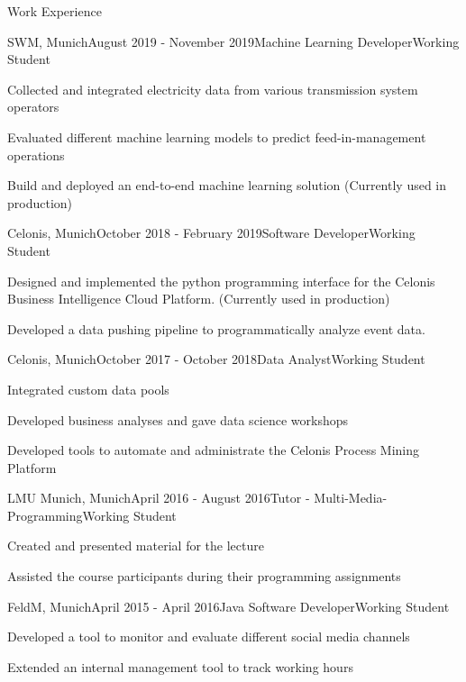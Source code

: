 \documentclass{resume} %
\begin{document}
\begin{rSection}{Work Experience}

\begin{rSubsection}{SWM, Munich}{August 2019 - November 2019}{Machine Learning Developer}{Working Student}
\item Collected and integrated electricity data from various 
transmission system operators
\item Evaluated different machine learning models to predict feed-in-management operations
\item Build and deployed an end-to-end machine learning solution (Currently used in production)
\end{rSubsection}

\begin{rSubsection}{Celonis, Munich}{October 2018 - February 2019}{Software Developer}{Working Student}
\item Designed and implemented the python programming interface for the Celonis Business Intelligence Cloud Platform. (Currently used in production)
\item Developed a data pushing pipeline to programmatically analyze event data.
\end{rSubsection}

\begin{rSubsection}{Celonis, Munich}{October 2017 - October 2018}{Data Analyst}{Working Student}
\item Integrated custom data pools
\item Developed business analyses and gave data science workshops
\item Developed tools to automate and administrate the Celonis Process Mining Platform
\end{rSubsection}

\begin{rSubsection}{LMU Munich, Munich}{April 2016 - August 2016}{Tutor - Multi-Media-Programming}{Working Student}
\item Created and presented material for the lecture
\item Assisted the course participants during their programming assignments
\end{rSubsection}

\vfill
\pagebreak

\begin{rSubsection}{FeldM, Munich}{April 2015 - April 2016}{Java Software Developer}{Working Student}
\item Developed a tool to monitor and evaluate different social media channels
\item Extended an internal management tool to track working hours
\end{rSubsection}

\end{rSection}
\end{document}
